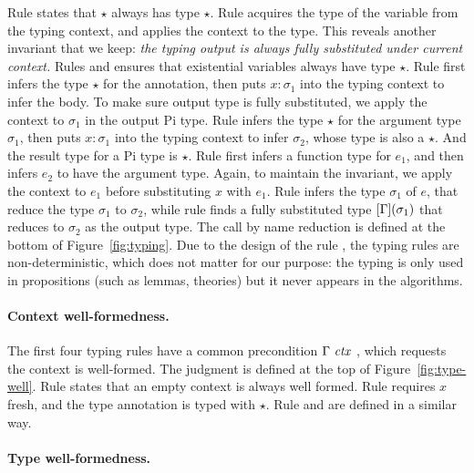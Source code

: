 Rule  states that $\star$ always has type $\star$.
Rule  acquires the type of the variable from the typing context, and
applies the context to the type.
This reveals another invariant that we keep:
\textit{the typing output is always fully substituted under current context.}
Rules  and  ensures that existential variables
always have type $\star$.
Rule  first infers the type $\star$ for the annotation, then puts $x:
\sigma_1$ into the typing context to infer the body. To make sure output type is
fully substituted, we apply the context to $\sigma_1$ in the output Pi type.
Rule  infers the type $\star$ for the argument type $\sigma_1$, then puts
$x: \sigma_1$ into the typing context to infer $\sigma_2$, whose type is also a
$\star$. And the result type for a Pi type is $\star$.
Rule  first infers a function type for $e_1$, and then infers $e_2$ to
have the argument type. Again, to maintain the invariant, we apply the context
to $e_1$ before substituting $x$ with $e_1$.
Rule  infers the type $\sigma_1$ of $e$, that reduce the type
$\sigma_1$ to $\sigma_2$, while rule  finds a fully substituted
type $[\Gamma](\sigma_1)$ that reduces to $\sigma_2$ as the output type. The call by name
reduction is defined at the bottom of Figure~\ref{fig:typing}.
Due to the design of the rule , the typing rules are
non-deterministic, which does not matter for our purpose: the typing is only
used in propositions (such as lemmas, theories) but it never appears in the
 algorithms.

\paragraph{Context well-formedness.}

The first four typing rules have a common precondition $\Gamma \ \mathit{ctx}\ $,
which requests the context is well-formed.
The judgment is defined at the top of Figure~\ref{fig:type-well}.
Rule  states that an empty context is always well formed.
Rule  requires $x$ fresh, and the type annotation is typed with
$\star$. Rule  and  are defined in a similar
way.

\paragraph{Type well-formedness.}

